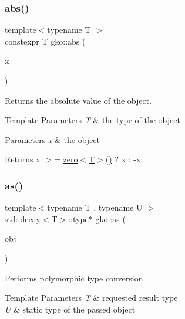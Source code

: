 \subsubsection{\texorpdfstring{abs()}{abs()}}
{\footnotesize\ttfamily template$<$typename T $>$ \\
constexpr T gko\+::abs (\begin{DoxyParamCaption}\item[{const T \&}]{x }\end{DoxyParamCaption})\hspace{0.3cm}{\ttfamily [inline]}}



Returns the absolute value of the object. 


\begin{DoxyTemplParams}{Template Parameters}
{\em T} & the type of the object\\
\hline
\end{DoxyTemplParams}

\begin{DoxyParams}{Parameters}
{\em x} & the object\\
\hline
\end{DoxyParams}
\begin{DoxyReturn}{Returns}
x $>$= \hyperlink{namespacegko_a70dbe01ff95c7b953d3d737424c6feb5}{zero$<$\+T$>$()} ? x \+: -\/x; 
\end{DoxyReturn}
\mbox{\label{namespacegko_a73ce7e87aec389b5210630bb617b4baa}} 
\subsubsection{\texorpdfstring{as()}{as()}\hspace{0.1cm}{\footnotesize\ttfamily [1/2]}}
{\footnotesize\ttfamily template$<$typename T , typename U $>$ \\
std\+::decay$<$T$>$\+::type$\ast$ gko\+::as (\begin{DoxyParamCaption}\item[{U $\ast$}]{obj }\end{DoxyParamCaption})\hspace{0.3cm}{\ttfamily [inline]}}



Performs polymorphic type conversion. 


\begin{DoxyTemplParams}{Template Parameters}
{\em T} & requested result type \\
\hline
{\em U} & static type of the passed object\\
\hline
\end{DoxyTemplParams}

